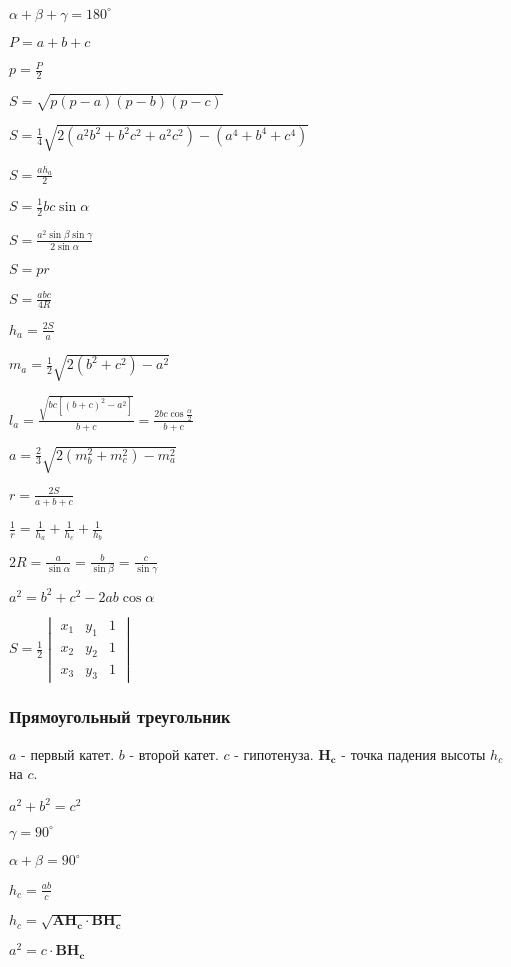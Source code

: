 $ \alpha + \beta + \gamma = 180^{\circ} $

$ P = a + b + c $

$ p = \frac{P}{2} $

$ S = \sqrt{p(p-a)(p-b)(p-c)} $

$ S = \frac{1}{4}\sqrt{2(a^2 b^2 + b^2 c^2 + a^2 c^2) - (a^4 + b^4 + c^4)} $

$S = \frac{a h_a}{2} $

$ S = \frac{1}{2} b c \sin \alpha $

$ S = \frac{a^2 \sin \beta \sin \gamma}{2 \sin \alpha} $

$ S = p r $

$ S = \frac{abc}{4 R} $

$ h_a = \frac{2 S}{a} $

$ m_a = \frac{1}{2} \sqrt{2(b^2 + c^2) - a^2} $

$ l_a = \frac{\sqrt{bc[(b+c)^2-a^2]}}{b+c} = \frac{2 b c \cos \frac{\alpha}{2}}{b + c} $

$ a = \frac{2}{3}\sqrt{2(m_b^2 + m_c^2) - m_a^2} $

$ r = \frac{2 S}{a + b + c} $

$ \frac{1}{r} = \frac{1}{h_a} + \frac{1}{h_c} + \frac{1}{h_b} $

$ 2 R = \frac{a}{\sin \alpha} = \frac{b}{\sin \beta} = \frac{c}{\sin \gamma} $

$ a^2 = b^2 + c^2 - 2 a b \cos \alpha $

$ S = \frac{1}{2} \begin{vmatrix}
	x_1 & y_1 & 1 \\
	x_2 & y_2 & 1 \\
	x_3 & y_3 & 1 
\end{vmatrix} $

\subsubsection{Прямоугольный треугольник}

$a$ - первый катет.
$b$ - второй катет.
$c$ - гипотенуза.
$\boldsymbol{H_c}$ - точка падения высоты $h_c$ на $c$.

$ a^2 + b^2 = c^2 $

$ \gamma = 90^{\circ} $

$ \alpha + \beta = 90^{\circ} $

$ h_c = \frac{a b}{c} $

$ h_c = \sqrt{\boldsymbol{AH_c}\cdot\boldsymbol{BH_c}} $

$ a^2 = c\cdot \boldsymbol{BH_c} $

